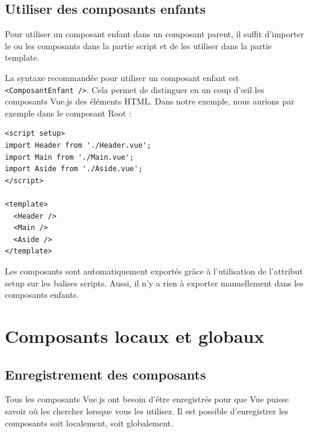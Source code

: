\subsection{Utiliser des composants enfants}
Pour utiliser un composant enfant dans un composant parent, il suffit d'importer le ou les composants dans la partie {\color{monOrange}script} et de les utiliser dans la partie {\color{monOrange}template}.

La syntaxe recommandée pour utiliser un composant enfant est {\tt <ComposantEnfant />}. Cela permet de distinguer en un coup d'œil les composants {\color{monOrange}Vue.js} des éléments HTML. Dans notre exemple, nous aurions par exemple dans le composant {\color{monOrange}Root }:
\begin{verbatim}
<script setup>
import Header from './Header.vue';
import Main from './Main.vue';
import Aside from './Aside.vue';
</script>

<template>
  <Header />
  <Main />
  <Aside />
</template>
\end{verbatim}
Les composants sont automatiquement exportés grâce à l'utilisation de l'attribut {\color{monOrange}setup} sur les balises {\color{monOrange}scripts}. Aussi, il n'y a rien à exporter manuellement dans les composants enfants.


\section{Composants locaux et globaux}
\subsection{Enregistrement des composants}
Tous les composants {\color{monOrange}Vue.js} ont besoin d'être enregistrés pour que {\color{monOrange}Vue} puisse savoir où les chercher lorsque vous les utilisez. Il est possible d'enregistrer les composants soit localement, soit globalement.

